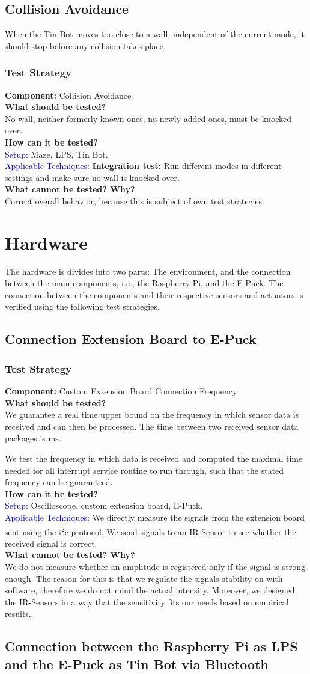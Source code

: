 \documentclass[a4paper,parskip,headheight=38pt]{scrartcl} %
\newcommand{\teststrat}[5]{
    \subsubsection{Test Strategy}
	\textbf{Component:} #1 \\
	\noindent\textbf{What should be tested?} \\
    \noindent #2 \\
	\noindent\textbf{How can it be tested?} \\
    \noindent\textcolor{blue}{Setup:} #3 \\
    \noindent\textcolor{blue}{Applicable Techniques:} #4 \\
	\noindent\textbf{What cannot be tested? Why?} \\
    \noindent #5
}
\newcommand{\ie}{i.e.}
\newcommand{\BLACK}{\textbf{Integration test: }}
\begin{document}
\subsection{Collision Avoidance}
When the Tin Bot moves too close to a wall, independent of the current mode, it
should stop before any collision takes place.
\teststrat{Collision Avoidance}{
    No wall, neither formerly known ones, no newly added ones, must be knocked
    over.
}{
    Maze, LPS, Tin Bot.
}{
    \BLACK Run different modes in different settings and make sure no
    wall is knocked over.
}{
    Correct overall behavior, because this is subject of own test strategies.
}

\section{Hardware} 
The hardware is divides into two parts: The environment, and the connection
between the main components, \ie, the Raspberry Pi, and the E-Puck. 
The connection between the components and their respective sensors and actuators
is verified using the following test strategies.

\subsection{Connection Extension Board to E-Puck}

\teststrat{Custom Extension Board Connection Frequency}{
    We guarantee a real time upper bound on the frequency in which sensor data
    is received and can then be processed. The time between two received
    sensor data packages is \todo[inline]{FREQUENCY}ms.

    We test the frequency in which data is received and computed the maximal
    time needed for all interrupt service routine to run through, such that the
    stated frequency can be guaranteed.
}{
    Oscilloscope, custom extension board, E-Puck.
}{
    We directly measure the signals from the extension board sent using the
    i\textsuperscript{2}c protocol. We send signals to an IR-Sensor to see
    whether the received signal is correct.
}{
   We do not measure whether an amplitude is registered only if the signal is
   strong enough. The reason for this is that we regulate the signals stability
   on with software, therefore we do not mind the actual intensity. Moreover, we
   designed the IR-Sensors in a way that the sensitivity fits our needs based on
   empirical results.
}

\subsection{Connection between the Raspberry Pi as LPS and the E-Puck as Tin Bot
via Bluetooth}
\end{document}
